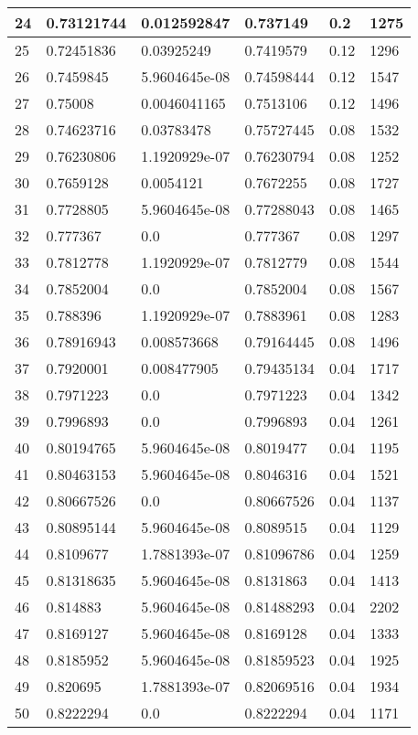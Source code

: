 \begin{longtable}{|l|l|l|l|l|l|}
24 & 0.73121744 & 0.012592847 & 0.737149 & 0.2 & 1275 \\ \hline 
25 & 0.72451836 & 0.03925249 & 0.7419579 & 0.12 & 1296 \\ \hline 
26 & 0.7459845 & 5.9604645e-08 & 0.74598444 & 0.12 & 1547 \\ \hline 
27 & 0.75008 & 0.0046041165 & 0.7513106 & 0.12 & 1496 \\ \hline 
28 & 0.74623716 & 0.03783478 & 0.75727445 & 0.08 & 1532 \\ \hline 
29 & 0.76230806 & 1.1920929e-07 & 0.76230794 & 0.08 & 1252 \\ \hline 
30 & 0.7659128 & 0.0054121 & 0.7672255 & 0.08 & 1727 \\ \hline 
31 & 0.7728805 & 5.9604645e-08 & 0.77288043 & 0.08 & 1465 \\ \hline 
32 & 0.777367 & 0.0 & 0.777367 & 0.08 & 1297 \\ \hline 
33 & 0.7812778 & 1.1920929e-07 & 0.7812779 & 0.08 & 1544 \\ \hline 
34 & 0.7852004 & 0.0 & 0.7852004 & 0.08 & 1567 \\ \hline 
35 & 0.788396 & 1.1920929e-07 & 0.7883961 & 0.08 & 1283 \\ \hline 
36 & 0.78916943 & 0.008573668 & 0.79164445 & 0.08 & 1496 \\ \hline 
37 & 0.7920001 & 0.008477905 & 0.79435134 & 0.04 & 1717 \\ \hline 
38 & 0.7971223 & 0.0 & 0.7971223 & 0.04 & 1342 \\ \hline 
39 & 0.7996893 & 0.0 & 0.7996893 & 0.04 & 1261 \\ \hline 
40 & 0.80194765 & 5.9604645e-08 & 0.8019477 & 0.04 & 1195 \\ \hline 
41 & 0.80463153 & 5.9604645e-08 & 0.8046316 & 0.04 & 1521 \\ \hline 
42 & 0.80667526 & 0.0 & 0.80667526 & 0.04 & 1137 \\ \hline 
43 & 0.80895144 & 5.9604645e-08 & 0.8089515 & 0.04 & 1129 \\ \hline 
44 & 0.8109677 & 1.7881393e-07 & 0.81096786 & 0.04 & 1259 \\ \hline 
45 & 0.81318635 & 5.9604645e-08 & 0.8131863 & 0.04 & 1413 \\ \hline 
46 & 0.814883 & 5.9604645e-08 & 0.81488293 & 0.04 & 2202 \\ \hline 
47 & 0.8169127 & 5.9604645e-08 & 0.8169128 & 0.04 & 1333 \\ \hline 
48 & 0.8185952 & 5.9604645e-08 & 0.81859523 & 0.04 & 1925 \\ \hline 
49 & 0.820695 & 1.7881393e-07 & 0.82069516 & 0.04 & 1934 \\ \hline 
50 & 0.8222294 & 0.0 & 0.8222294 & 0.04 & 1171 \\ \hline 
\end{longtable}